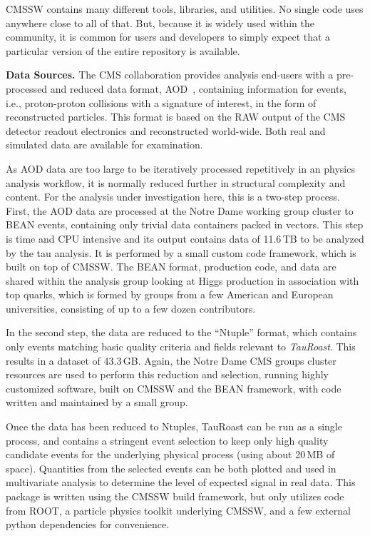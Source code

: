 \documentclass{sig-alternate}
\begin{document}
CMSSW contains many different tools, libraries, and utilities.  No single code uses anywhere close to all of that.  But, because it is widely used within the community, it is common for users and developers to simply expect that a particular version of the entire repository is available.
 
{\bf Data Sources.}
The CMS collaboration provides analysis end-users with a pre-processed
and reduced data format, AOD~\cite{holtman2001cms}, containing information for events, i.e.,
proton-proton collisions with a signature of interest, in the form of
reconstructed particles.  This format is based on the RAW output of
the CMS detector readout electronics and reconstructed world-wide.
Both real and simulated data are available for examination.

As AOD data are too large to be iteratively processed repetitively in
an physics analysis workflow, it is normally reduced further in
structural complexity and content.  For the analysis under
investigation here, this is a two-step process.  First, the AOD data
are processed at the Notre Dame working group cluster to BEAN events,
containing only trivial data containers packed in vectors.  This step
is time and CPU intensive and its output contains data of 11.6$\,$TB to be
analyzed by the tau analysis.
It is performed by a small custom code framework, which is built on top of CMSSW.
The BEAN format, production code, and
data are shared within the analysis group looking at Higgs production
in association with top quarks, which is formed by groups from a few
American and European universities,
consisting of up to a few dozen contributors.

In the second step, the data are reduced to the ``Ntuple'' format,
which contains only events matching basic quality criteria and
fields relevant to \emph{TauRoast}. This results in
a dataset of 43.3$\,$GB.  Again, the Notre Dame CMS groups cluster
resources are used to perform this reduction and selection,
running highly customized software,
built on CMSSW and the BEAN framework,
with code written and maintained by a small group.

Once the data has been reduced to Ntuples, TauRoast can be run as a single
process, and contains a stringent event selection to keep only high
quality candidate events for the underlying physical process (using
about 20$\,$MB of space).  Quantities from the selected events can be
both plotted and used in multivariate analysis to determine the level
of expected signal in real data.
This package is written using the CMSSW build framework,
but only utilizes code from ROOT,
a particle physics toolkit underlying CMSSW,
and a few external python dependencies for convenience.
\end{document}
